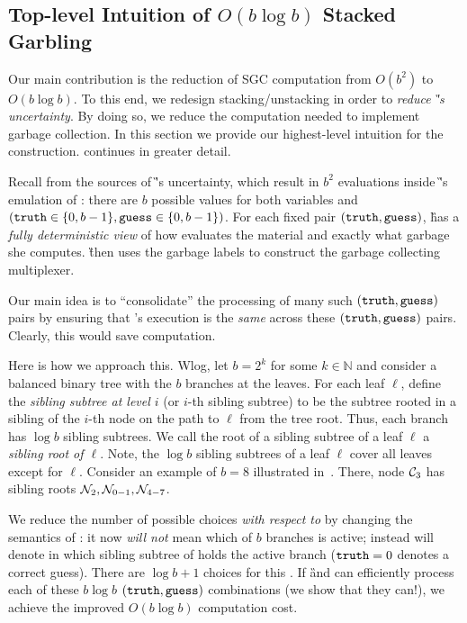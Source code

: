 
\subsection{Top-level Intuition of $O(b \log b)$ Stacked Garbling}
\label{sec:intuition}

Our main contribution is the reduction of SGC computation from
$O(b^2)$ to $O(b \log b)$.  To this end, we redesign
stacking/unstacking in order to \emph{reduce \G's
uncertainty}.
%
By doing so, we reduce the computation needed to implement garbage
collection.
%
In this section we provide our highest-level intuition for the
construction.  continues in greater detail.

Recall from  the  sources of \G's
uncertainty, which result in $b^2$ evaluations inside \G's emulation
of \E: there are $b$ possible values for both variables \truth and \guess
$(\mathtt{truth} \in\{0,b-1\}, \mathtt{guess}\in\{0,b-1\})$.
%
For each fixed pair  $(\mathtt{truth},\mathtt{guess})$, \G has a {\em fully
deterministic view} of how \E evaluates the material and exactly
what garbage she computes. 
\G then uses the
garbage labels to construct the garbage collecting multiplexer.

Our main idea is to ``consolidate'' the processing of many
such $(\mathtt{truth},\mathtt{guess})$ pairs by ensuring that \E's execution is the {\em
same} across these $(\mathtt{truth},\mathtt{guess})$ pairs.  Clearly, this would
save computation.

Here is how we approach this.
Wlog, let $b = 2^k$ for some $k \in \mathbb{N}$ and consider a balanced
binary tree with the $b$ branches at the leaves.
For each leaf $\ell$, define the {\em sibling subtree at level $i$} (or
$i$-th  sibling subtree) to be the subtree rooted in a sibling of the
$i$-th node on the path to $\ell$ from the tree root.  Thus, each branch
has $\log b$ sibling subtrees.
We call the root of a
sibling subtree of a leaf $\ell$ a {\em sibling root of $\ell$}.
Note, the $\log b$ sibling subtrees of a leaf $\ell$ 
cover all leaves except for $\ell$.
Consider an example of $b=8$ illustrated in~.  There, node $\mathcal C_3$ has sibling roots $\mathtt{\cal N}_2, \mathtt{\cal N}_{0-1}, \mathtt{\cal N}_{4-7}$.  

We reduce the number of possible \truth choices  {\em with respect to
\guess}  by changing the semantics of \truth: it
now \emph{will not} mean which of $b$ branches is active; instead \truth
will denote in which sibling subtree of \guess holds the active branch
($\mathtt{truth}=0$ denotes a correct guess).  There are $\log b + 1$
choices for this \truth.  If \G and \E can efficiently process each
of these $b\log b$  $(\mathtt{truth},\mathtt{guess})$ combinations  (we show that they
can!), we achieve the improved $O(b\log b)$ computation cost.

